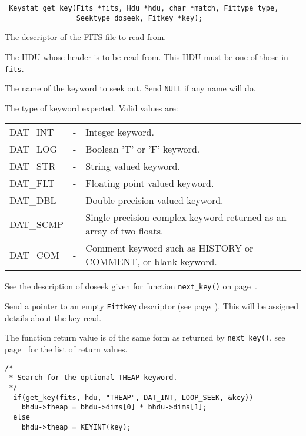 \label{get_key}\begin{verbatim}
 Keystat get_key(Fits *fits, Hdu *hdu, char *match, Fittype type,
                 Seektype doseek, Fitkey *key);
\end{verbatim}
\begin{arglist}

 The descriptor of the FITS file to read from.

 The HDU whose header is to be read from. This HDU must be
            one of those in \verb`fits`.

 The name of the keyword to seek out. Send \verb`NULL` if any name
            will do.

 The type of keyword expected. Valid values are:\nopagebreak

                   \begin{tabular}{lcp{5in}}
                     DAT\_INT  & - &  Integer keyword. \\
                     DAT\_LOG  & - &  Boolean 'T' or 'F' keyword. \\
                     DAT\_STR  & - &  String valued keyword. \\
                     DAT\_FLT  & - &  Floating point valued keyword. \\
                     DAT\_DBL  & - &  Double precision valued keyword. \\
                     DAT\_SCMP & - &  Single precision complex
                          keyword returned as an array of two floats. \\
                     DAT\_COM  & - &  Comment keyword such as
                          HISTORY or COMMENT, or blank keyword. \\
                   \end{tabular}

 See the description of doseek given for function
              \verb`next_key()` on page~\pageref{doseek}.

 Send a pointer to an empty \verb`Fittkey` descriptor
                  (see page~\pageref{Fitkey}). This will be assigned
                  details about the key read.
\end{arglist}

The function return value is of the same form as returned by
\verb`next_key()`, see page~\pageref{Keystat} for the list of return values.

\begin{verbatim}
/*
 * Search for the optional THEAP keyword.
 */
  if(get_key(fits, hdu, "THEAP", DAT_INT, LOOP_SEEK, &key))
    bhdu->theap = bhdu->dims[0] * bhdu->dims[1];
  else
    bhdu->theap = KEYINT(key);
\end{verbatim}


